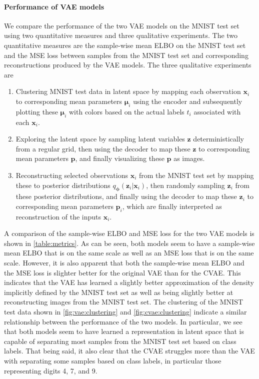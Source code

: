 \paragraph{Performance of VAE models}
We compare the performance of the two VAE models on the MNIST test set using two quantitative measures and three qualitative experiments. The two quantitative measures are the sample-wise mean ELBO on the MNIST test set and the MSE loss between samples from the MNIST test set and corresponding reconstructions produced by the VAE models. The three qualitative experiments are
\begin{enumerate}
    \item Clustering MNIST test data in latent space by mapping each observation $\mathbf{x}_i$ to corresponding mean parameters $\bm{\mu}_i$ using the encoder and subsequently plotting these $\bm{\mu}_i$ with colors based on the actual labels $t_i$ associated with each $\mathbf{x}_i$.
    \item Exploring the latent space by sampling latent variables $\mathbf{z}$ deterministically from a regular grid, then using the decoder to map these $\mathbf{z}$ to corresponding mean parameters $\mathbf{p}$,  and finally visualizing these $\mathbf{p}$ as images.
    \item Reconstructing selected observations $\mathbf{x}_i$ from the MNIST test set by mapping these to posterior distributions $q_{\bm{\phi}}(\mathbf{z}_i|\mathbf{x}_i)$, then randomly sampling $\mathbf{z}_i$ from these posterior distributions, and finally using the decoder to map these $\mathbf{z}_i$ to corresponding mean parameters $\mathbf{p}_i$, which are finally interpreted as reconstruction of the inputs $\mathbf{x}_i$.
\end{enumerate}
A comparison of the sample-wise ELBO and MSE loss for the two VAE models is shown in \cref{table:metrics}. As can be seen, both models seem to have a sample-wise mean ELBO that is on the same scale as well as an MSE loss that is on the same scale. However, it is also apparent that both the sample-wise mean ELBO and the MSE loss is slighter better for the original VAE than for the CVAE\@. This indicates that the VAE has learned a slightly better approximation of the density implicitly defined by the MNIST test set as well as being slightly better at reconstructing images from the MNIST test set. The clustering of the MNIST test data shown in \cref{fig:vae:clustering} and \cref{fig:cvae:clustering} indicate a similar relationship between the performance of the two models. In particular, we see that both models seem to have learned a representation in latent space that is capable of separating most samples from the MNIST test set based on class labels. That being said, it also clear that the CVAE struggles more than the VAE with separating some samples based on class labels, in particular those representing digits 4, 7, and 9. 

